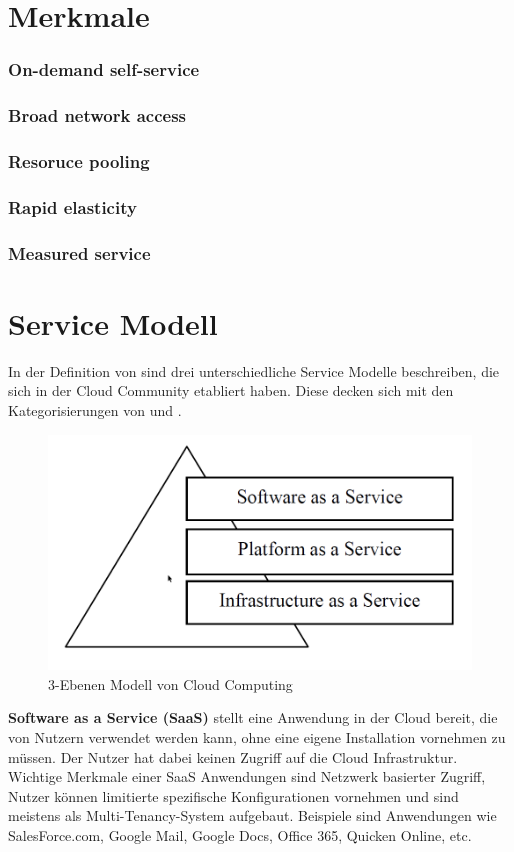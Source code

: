 \section{Merkmale}
\subsubsection{On-demand self-service}\label{selfservice}
\subsubsection{Broad network access}\label{networkaccess}
\subsubsection{Resoruce pooling}\label{resourcepooling}
\subsubsection{Rapid elasticity}\label{rapidelasticity}
\subsubsection{Measured service}\label{measuredservice}
\cite*[vgl.][S.2]{Mell.2011}

\section{Service Modell}\label{serviceModell}
In der Definition von \cite*[S.2]{Mell.2011} sind drei unterschiedliche Service Modelle beschreiben, die sich in der Cloud Community etabliert haben. Diese decken sich mit den Kategorisierungen von \cite[S. 28]{Tharam.2010} und \cite[S. 878]{Jadeja.2012}.

	\begin{figure}[h]
		\centering
		\includegraphics[width=0.5\linewidth]{images/cloud_computing_pyramide}
		\caption{3-Ebenen Modell von Cloud Computing}
		\label{fig:CloudComputingPyramide}
	\end{figure}


\textbf{Software as a Service (SaaS)} stellt eine Anwendung in der Cloud bereit, die von Nutzern verwendet werden kann, ohne eine eigene Installation vornehmen zu müssen. Der Nutzer hat dabei keinen Zugriff auf die Cloud Infrastruktur. Wichtige Merkmale einer SaaS Anwendungen sind Netzwerk basierter Zugriff, Nutzer können limitierte spezifische Konfigurationen vornehmen und sind meistens als Multi-Tenancy-System aufgebaut. Beispiele sind Anwendungen wie SalesForce.com, Google Mail, Google Docs, Office 365, Quicken Online, etc.
\\

